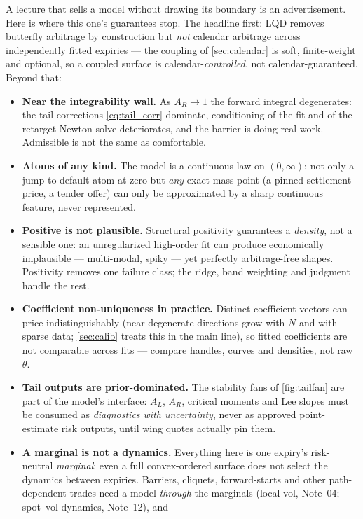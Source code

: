 \documentclass[11pt]{article}
\begin{document}
A lecture that sells a model without drawing its boundary is an
advertisement.  Here is where this one's guarantees stop.  The headline
first: LQD removes butterfly arbitrage by construction but \emph{not}
calendar arbitrage across independently fitted expiries --- the coupling of
\cref{sec:calendar} is soft, finite-weight and optional, so a coupled
surface is calendar-\emph{controlled}, not calendar-guaranteed.  Beyond
that:
\begin{itemize}[leftmargin=1.4em]
\item \textbf{Near the integrability wall.}  As $A_R\to1$ the forward
integral degenerates: the tail corrections \eqref{eq:tail_corr} dominate,
conditioning of the fit and of the retarget Newton solve deteriorates, and
the barrier is doing real work.  Admissible is not the same as comfortable.
\item \textbf{Atoms of any kind.}  The model is a continuous law on
$(0,\infty)$: not only a jump-to-default atom at zero but \emph{any} exact
mass point (a pinned settlement price, a tender offer) can only be
approximated by a sharp continuous feature, never represented.
\item \textbf{Positive is not plausible.}  Structural positivity guarantees
a \emph{density}, not a sensible one: an unregularized high-order fit can
produce economically implausible --- multi-modal, spiky --- yet perfectly
arbitrage-free shapes.  Positivity removes one failure class; the ridge,
band weighting and judgment handle the rest.
\item \textbf{Coefficient non-uniqueness in practice.}  Distinct coefficient
vectors can price indistinguishably (near-degenerate directions grow with
$N$ and with sparse data; \cref{sec:calib} treats this in the main line),
so fitted coefficients are not comparable across fits --- compare handles,
curves and densities, not raw $\theta$.
\item \textbf{Tail outputs are prior-dominated.}  The stability fans of
\cref{fig:tailfan} are part of the model's interface: $A_L$, $A_R$,
critical moments and Lee slopes must be consumed as \emph{diagnostics with
uncertainty}, never as approved point-estimate risk outputs, until wing
quotes actually pin them.
\item \textbf{A marginal is not a dynamics.}  Everything here is one
expiry's risk-neutral \emph{marginal}; even a full convex-ordered surface
does not select the dynamics between expiries.  Barriers, cliquets,
forward-starts and other path-dependent trades need a model \emph{through}
the marginals (local vol, Note~04; spot--vol dynamics, Note~12), and

\end{itemize}
\end{document}
